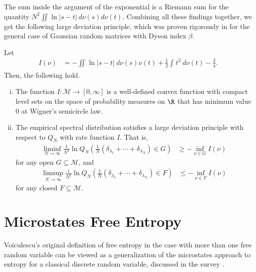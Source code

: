 \documentclass[10pt]{mypackage}
\begin{document}
The sum inside the argument of the exponential is a Riemann sum for the quantity $N^2 \iint \ln\left\vert s-t \right\vert\: d\nu(s)d\nu(t)$. Combining all these findings together, we get the following large deviation principle, which was proven rigorously in \cite{large_deviations_wigner_matrices} for the general case of Gaussian random matrices with Dyson index $\beta$.
\begin{theorem}
  Let
  \begin{align*}
    I\left( \nu \right) &= - \iint_{}^{} \ln\left\vert s-t \right\vert\:d\nu(s)\nu(t) + \frac{1}{2} \int_{}^{} t^2\:d\nu(t) - \frac{3}{4}.
  \end{align*}
  Then, the following hold.
  \begin{enumerate}[(i)]
    \item The function $I\colon \mathcal{M}\rightarrow [0,\infty]$ is a well-defined convex function with compact level sets on the space of probability measures on $\R$ that has minimum value $0$ at Wigner's semicircle law.
    \item The empirical spectral distribution satisfies a large deviation principle with respect to $Q_N$ with rate function $I$. That is,
      \begin{align*}
        \liminf_{N\rightarrow\infty} \frac{1}{N^2} \ln Q_N\left( \frac{1}{N}\left( \delta_{\lambda_1} + \cdots + \delta_{\lambda_N} \right)\in G \right) &\geq -\inf_{\nu\in G} I\left( \nu \right)
      \end{align*}
      for any open $G\subseteq \mathcal{M}$, and
      \begin{align*}
        \limsup_{N\rightarrow\infty} \frac{1}{N^2} \ln Q_N\left( \frac{1}{N}\left( \delta_{\lambda_1} + \cdots + \delta_{\lambda_N} \right)\in F \right) &\leq -\inf_{\nu\in F} I\left( \nu \right)
      \end{align*}
      for any closed $F\subseteq \mathcal{M}$.
  \end{enumerate}
\end{theorem}
\section{Microstates Free Entropy}%
Voiculescu's original definition of free entropy in the case with more than one free random variable can be viewed as a generalization of the microstates approach to entropy for a classical discrete random variable, discussed in the survey \cite{voiculescu2001freeentropy}.
\end{document}
